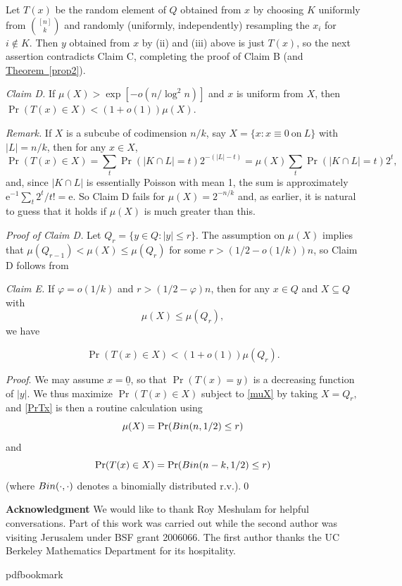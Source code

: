 \documentclass[11pt]{article}
\numberwithin{equation}{section}
\theoremstyle{definition}
\theoremstyle{plain}
\newcommand{\eee}{\mathrm e}
\newcommand{\expref}[2]{\hyperref[#2]{#1~\ref{#2}}}
\newcommand{\beq}[1]{\begin{equation}\label{#1}}
\newcommand{\enq}[0]{\end{equation}}
\newcommand{\mn}[0]{\medskip\noindent}
\newcommand{\sub}[0]{\subseteq}
\newcommand{\0}[0]{\emptyset}
\newcommand{\vp}[0]{\varphi}
\def\vp{\varphi}
\def\vp{\varphi}
\begin{document}
Let $T(x)$ be
the random element of $Q$ %
obtained %
from $x$
by choosing $K$ uniformly from $\binom{[n]}{k}$ and
randomly (uniformly, independently) 
resampling %
the %
$x_i$  %
%
%
%
for $i\not\in K$.    %
Then $y$ %
obtained  %
from $x$ by (ii) and (iii) above is just $T(x)$,
so
the next assertion contradicts Claim C, completing the proof of
Claim B (and \expref{Theorem}{prop2}).



\mn
\emph{Claim D.}
If $\mu(X) > \exp[-o(n/\log^2n)]$
and $x$ is uniform from $X$, then $\Pr(T(x)\in X) < (1+o(1))\mu(X)$.

\mn
\emph{Remark.}
If $X$ is a subcube of codimension $n/k$, say
$X=\{x:x \equiv 0 ~\mbox{on}~L\}$ with $|L |=n/k$,
then for any $x\in X$,
$$
\Pr(T(x)\in X) =\sum_t\Pr(|K\cap L |=t)2^{-(|L|-t)}
=\mu(X)\sum_t\Pr(|K\cap L |=t)2^t,
$$
and, since $|K\cap L|$ is essentially Poisson with mean 1,
the sum is
approximately
$ \eee^{-1}\sum_t2^t/t! = \eee$.
So Claim D fails for $\mu(X) = 2^{-n/k}$ and, as earlier,
it is %
natural to guess that it holds if $\mu(X)$ is much
%
greater  %
than this.

\mn
\emph{Proof of Claim D.}
Let $Q_r=\{y\in Q:|y|\leq r\}$.
The assumption on $\mu(X)$ implies that
$\mu(Q_{r-1})<\mu(X) \leq \mu(Q_r)$
for some $r >(1/2-o(1/k))n$, so Claim D follows from

\mn
\emph{Claim E.}
If $\vp =o(1/k)$ and $r > (1/2-\vp)n$, then for any $x\in Q$ and
$X\sub Q$ with
\beq{muX}
\mu(X) \leq \mu(Q_r),
\enq
we have

\beq{PrTx}
\Pr(T(x)\in X) < (1+o(1))\mu(Q_r).
\enq

\mn
\emph{Proof}.
We may assume $x=\underline{0}$, so that $\Pr(T(x)=y)$ is a decreasing
function of $|y|$.
We thus maximize $\Pr(T(x)\in X)$
subject to \eqref{muX} by taking
$
X=Q_r,
$
and \eqref{PrTx} is then a routine calculation
using
$$\mu(X) =\Pr({\rm Bin}(n,1/2)\leq r)$$
and
$$\Pr(T(x)\in X) =\Pr({\rm Bin}(n-k,1/2)\leq r)$$
(where ${\rm Bin}(\cdot,\cdot)$ denotes a binomially
distributed r.v.).\qed


\mn
{\bf Acknowledgment}
We would like to thank Roy Meshulam for helpful conversations.
Part of this work was carried out while the second author
was visiting Jerusalem
under BSF grant 2006066.
The first author
%
%
thanks the UC Berkeley %
Mathematics Department  %
for its hospitality.

%

\newcommand{\prelim}{Preliminary version in\ }\newcommand{\prelims}{Preliminary
  versions in\ }
\providecommand{\bibhead}[1]{}
\expandafter\ifx\csname pdfbookmark\endcsname\relax%
  \providecommand{\tocrefpdfbookmark}{}
\else\providecommand{\tocrefpdfbookmark}{%
   \hypertarget{tocreferences}{}%
   \pdfbookmark[1]{References}{tocreferences}}%
\fi
\end{document}
